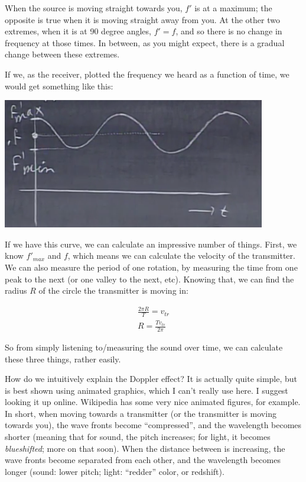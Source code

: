 \documentclass[8.01x]{subfiles}
\begin{document}
When the source is moving straight towards you, $f'$ is at a maximum; the opposite is true when it is moving straight away from you. At the other two extremes, when it is at 90 degree angles, $f' = f$, and so there is no change in frequency at those times. In between, as you might expect, there is a gradual change between these extremes.

If we, as the receiver, plotted the frequency we heard as a function of time, we would get something like this:

\begin{center}
\includegraphics[scale=0.5]{Graphics/lec23_doppler_circle}
\end{center}

If we have this curve, we can calculate an impressive number of things. First, we know ${f'}_{max}$ and $f$, which means we can calculate the velocity of the transmitter.\\
We can also measure the period of one rotation, by measuring the time from one peak to the next (or one valley to the next, etc). Knowing that, we can find the radius $R$ of the circle the transmitter is moving in:

\begin{align}
\frac{2 \pi R}{T} = v_{tr}\\
R = \frac{T v_{tr}}{2 \pi}
\end{align}

So from simply listening to/measuring the sound over time, we can calculate these three things, rather easily.

How do we intuitively explain the Doppler effect? It is actually quite simple, but is best shown using animated graphics, which I can't really use here. I suggest looking it up online. Wikipedia has some very nice animated figures, for example.\\
In short, when moving towards a transmitter (or the transmitter is moving towards you), the wave fronts become ``compressed'', and the wavelength becomes shorter (meaning that for sound, the pitch increases; for light, it becomes \emph{blueshifted}; more on that soon). When the distance between is increasing, the wave fronts become separated from each other, and the wavelength becomes longer (sound: lower pitch; light: ``redder'' color, or redshift).
\end{document}

